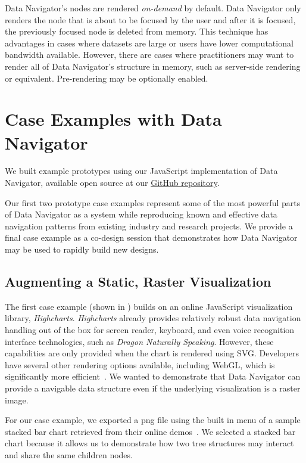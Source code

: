 \documentclass[12pt]{cmuthesis}
\begin{document}
Data Navigator's nodes are rendered \textit{on-demand} by default. Data Navigator only renders the node that is about to be focused by the user and after it is focused, the previously focused node is deleted from memory. This technique has advantages in cases where datasets are large or users have lower computational bandwidth available. However, there are cases where practitioners may want to render all of Data Navigator's structure in memory, such as server-side rendering or equivalent. Pre-rendering may be optionally enabled.

\section{Case Examples with Data Navigator}
We built example prototypes using our JavaScript implementation of Data Navigator, available open source at our \href{https://github.com/cmudig/data-navigator}{GitHub repository}.

Our first two prototype case examples represent some of the most powerful parts of Data Navigator as a system while reproducing known and effective data navigation patterns from existing industry and research projects. We provide a final case example as a co-design session that demonstrates how Data Navigator may be used to rapidly build new designs.

\subsection{Augmenting a Static, Raster Visualization}
\label{section:raster}
The first case example (shown in ) builds on an online JavaScript visualization library, \textit{Highcharts}. \textit{Highcharts} already provides relatively robust data navigation handling out of the box for screen reader, keyboard, and even voice recognition interface technologies, such as \textit{Dragon Naturally Speaking}. However, these capabilities are only provided when the chart is rendered using SVG. Developers have several other rendering options available, including WebGL, which is significantly more efficient~\cite{HighsoftBoost}. We wanted to demonstrate that Data Navigator can provide a navigable data structure even if the underlying visualization is a raster image.

For our case example, we exported a png file using the built in menu of a sample stacked bar chart retrieved from their online demos~\cite{HighchartsStacked}. We selected a stacked bar chart because it allows us to demonstrate how two tree structures may interact and share the same children nodes.
\end{document}
